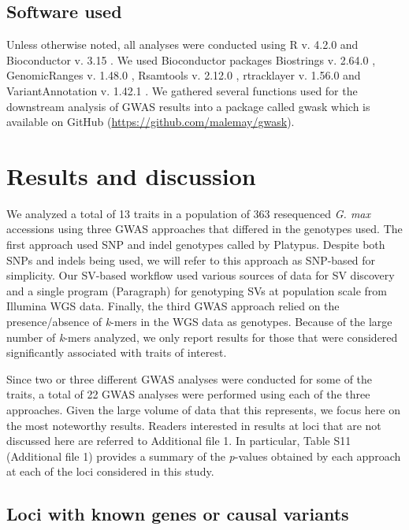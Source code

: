 \documentclass{article}
\begin{document}
\subsection*{Software used}
\label{sv-gwas-software-used}

Unless otherwise noted, all analyses were conducted using R v. 4.2.0
\citep{r2022} and Bioconductor v. 3.15 \citep{huber2015}. We used Bioconductor
packages Biostrings v. 2.64.0 \citep{pages2022}, GenomicRanges v. 1.48.0
\citep{lawrence2013}, Rsamtools v. 2.12.0 \citep{rsamtools2022}, rtracklayer v.
1.56.0 \citep{lawrence2009} and VariantAnnotation v. 1.42.1
\citep{obenchain2014}.  We gathered several functions used for the downstream
analysis of GWAS results into a package called gwask which is available on
GitHub (\url{https://github.com/malemay/gwask}).

\section*{Results and discussion}

We analyzed a total of 13 traits in a population of 363 resequenced \textit{G.
max} accessions using three GWAS approaches that differed in the genotypes
used. The first approach used SNP and indel genotypes called by Platypus.
Despite both SNPs and indels being used, we will refer to this approach as
SNP-based for simplicity. Our SV-based workflow used various sources of data
for SV discovery and a single program (Paragraph) for genotyping SVs at
population scale from Illumina WGS data. Finally, the third GWAS approach
relied on the presence/absence of \textit{k}-mers in the WGS data as genotypes.
Because of the large number of \textit{k}-mers analyzed, we only report results
for those that were considered significantly associated with traits of
interest.

Since two or three different GWAS analyses were conducted for some of the
traits, a total of 22 GWAS analyses were performed using each of the three
approaches.  Given the large volume of data that this represents, we focus here
on the most noteworthy results. Readers interested in results at loci that are
not discussed here are referred to Additional file 1. In particular, Table
S11 (Additional file 1) provides a summary of the
\textit{p}-values obtained by each approach at each of the loci considered in
this study.

\subsection*{Loci with known genes or causal variants}
\end{document}
